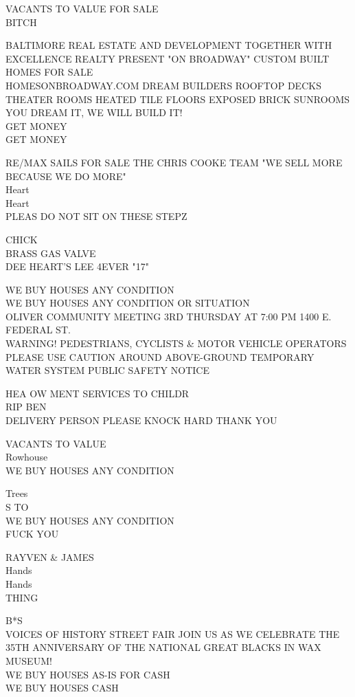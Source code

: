 \documentclass[10pt,letterpaper]{article}
\begin{document}
VACANTS TO VALUE FOR SALE\\
BITCH

BALTIMORE REAL ESTATE AND DEVELOPMENT TOGETHER WITH EXCELLENCE REALTY PRESENT "ON BROADWAY" CUSTOM BUILT HOMES FOR SALE\\
HOMESONBROADWAY.COM DREAM BUILDERS ROOFTOP DECKS THEATER ROOMS HEATED TILE FLOORS EXPOSED BRICK SUNROOMS YOU DREAM IT, WE WILL BUILD IT!\\
GET MONEY\\
GET MONEY

RE/MAX SAILS FOR SALE THE CHRIS COOKE TEAM "WE SELL MORE BECAUSE WE DO MORE"\\
Heart\\
Heart\\
PLEAS DO NOT SIT ON THESE STEPZ

CHICK\\
BRASS GAS VALVE\\
DEE HEART'S LEE 4EVER "17"

WE BUY HOUSES ANY CONDITION\\
WE BUY HOUSES ANY CONDITION OR SITUATION\\
OLIVER COMMUNITY MEETING 3RD THURSDAY AT 7:00 PM 1400 E. FEDERAL ST.\\
WARNING!  PEDESTRIANS, CYCLISTS \& MOTOR VEHICLE OPERATORS PLEASE USE CAUTION AROUND ABOVE{-}GROUND TEMPORARY WATER SYSTEM PUBLIC SAFETY NOTICE

HEA OW MENT SERVICES TO CHILDR\\
RIP BEN\\
DELIVERY PERSON PLEASE KNOCK HARD THANK YOU

VACANTS TO VALUE\\
Rowhouse\\
WE BUY HOUSES ANY CONDITION

Trees\\
S TO\\
WE BUY HOUSES ANY CONDITION\\
FUCK YOU

RAYVEN \& JAMES\\
Hands\\
Hands\\
THING

B*S\\
VOICES OF HISTORY STREET FAIR JOIN US AS WE CELEBRATE THE 35TH ANNIVERSARY OF THE NATIONAL GREAT BLACKS IN WAX MUSEUM!\\
WE BUY HOUSES AS{-}IS FOR CASH\\
WE BUY HOUSES CASH
\end{document}
